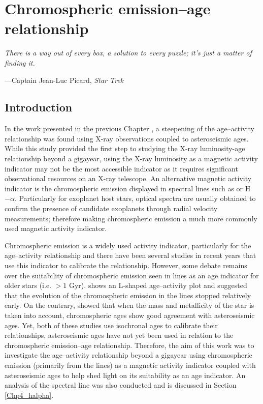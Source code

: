 
\chapter{Chromospheric emission--age relationship} %

\label{Chapter4} %

\epigraph{\itshape There is a way out of every box, a solution to every puzzle; it's just a matter of finding it.}{---Captain Jean-Luc Picard, \itshape Star Trek}

\section{Introduction}

In the work presented in the previous Chapter \citep{Booth_etal_2017}, a steepening of the age--activity relationship was found using X-ray observations coupled to asteroseismic ages. While this study provided the first step to studying the X-ray luminosity-age relationship beyond a gigayear, using the X-ray luminosity as a magnetic activity indicator may not be the most accessible indicator as it requires significant observational resources on an X-ray telescope. An alternative magnetic activity indicator is the chromospheric emission displayed in spectral lines such as \caII or H$-\alpha$. Particularly for exoplanet host stars, optical spectra are usually obtained to confirm the presence of candidate exoplanets through radial velocity measurements; therefore making chromospheric emission a much more commonly used magnetic activity indicator.

Chromospheric emission is a widely used activity indicator, particularly for the age--activity relationship and there have been several studies in recent years that use this indicator to calibrate the relationship. However, some debate remains over the suitability of chromospheric emission seen in \caII lines as an age indicator for older stars (i.e. $> 1$ Gyr). \citet{Pace_2013} shows an L-shaped age--activity plot and suggested that the evolution of the chromospheric emission in the \caII lines stopped relatively early. On the contrary, \citet{Lorenzo_Oliveira_etal_2016} showed that when the mass and metallicity of the star is taken into account, chromospheric ages show good agreement with asteroseismic ages. Yet, both of these studies use isochronal ages to calibrate their relationships, asteroseismic ages have not yet been used in relation to the chromospheric emission--age relationship. Therefore, the aim of this work was to investigate the age--activity relationship beyond a gigayear using chromospheric emission (primarily from the \caII lines) as a magnetic activity indicator coupled with asteroseismic ages to help shed light on its suitability as an age indicator. An analysis of the \Halpha spectral line was also conducted and is discussed in Section \ref{Chp4_halpha}.

